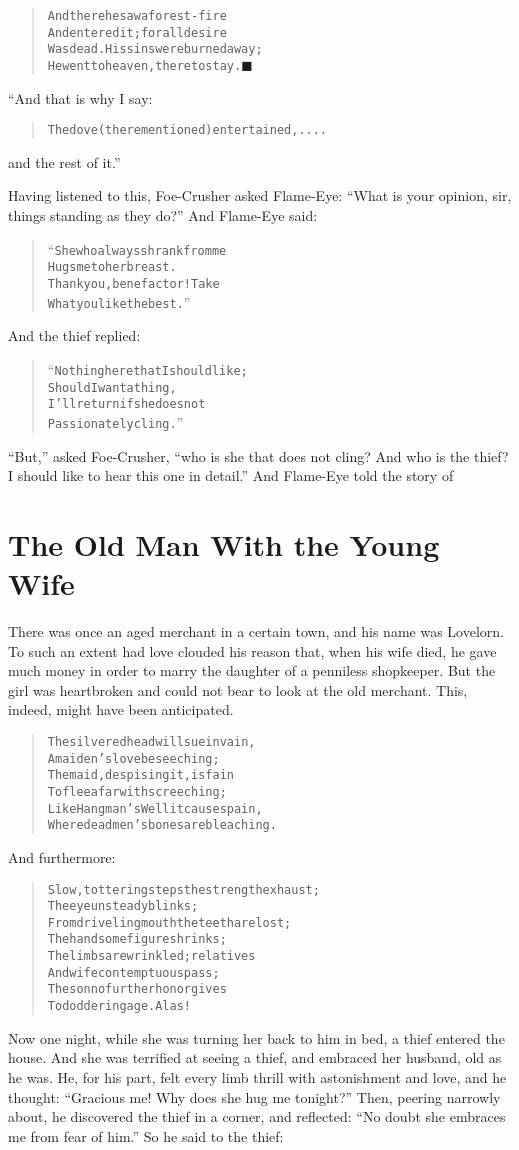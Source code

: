 \documentclass[article, twoside, 14pt]{memoir}
\newcommand{\qed}{\hfill \ensuremath{\blacksquare}}
\renewenvironment{verbatim}{%
\begin{quote}%
\vskip -10pt%
\begin{alltt}\normalfont\large}{\end{alltt}%
\end{quote}%
\vskip -10pt
} %
\begin{document}
\begin{verbatim}
And there he saw a forest-fire
And entered it; for all desire
Was dead. His sins were burned away;
He went to heaven, there to stay.\hyperref[s55]{\qed}
\end{verbatim}
“And that is why I say:

\begin{verbatim}
The dove (there mentioned) entertained, ....
\end{verbatim}
and the rest of it.”

Having listened to this, Foe-Crusher asked Flame-Eye:
``What is your opinion, sir, things standing as they do?'' And
Flame-Eye said:

\begin{verbatim}
“She who always shrank from me
Hugs me to her breast.
Thank you, benefactor! Take
What you like the best.”
\end{verbatim}
And the thief replied:

\begin{verbatim}
“Nothing here that I should like;
Should I want a thing,
I'll return if she does not
Passionately cling.”
\end{verbatim}
``But,'' asked Foe-Crusher,
``who is she that does not cling? And who is the thief? I should like to hear this one in detail.''
And Flame-Eye told the story of

\chapter{The Old Man With the Young Wife}

\label{s56}

There was once an aged merchant in a certain town, and his name was
Lovelorn. To such an extent had love clouded his reason that, when
his wife died, he gave much money in order to marry the daughter of
a penniless shopkeeper. But the girl was heartbroken and could not
bear to look at the old merchant. This, indeed, might have been
anticipated.

\begin{verbatim}
The silvered head will sue in vain,
    A maiden's love beseeching;
The maid, despising it, is fain
    To flee afar with screeching;
Like Hangman's Well it causes pain,
    Where dead men's bones are bleaching.
\end{verbatim}
And furthermore:

\begin{verbatim}
Slow, tottering steps the strength exhaust;
    The eye unsteady blinks;
From driveling mouth the teeth are lost;
    The handsome figure shrinks;
The limbs are wrinkled; relatives
    And wife contemptuous pass;
The son no further honor gives
    To doddering age. Alas!
\end{verbatim}
Now one night, while she was turning her back to him in bed, a
thief entered the house. And she was terrified at seeing a
thief, and embraced her husband, old as he was. He, for his part,
felt every limb thrill with astonishment and love, and he thought:
``Gracious me! Why does she hug me tonight?'' Then, peering
narrowly about, he discovered the thief in a corner, and reflected:
``No doubt she embraces me from fear of him.'' So he said to the
thief:
\end{document}
